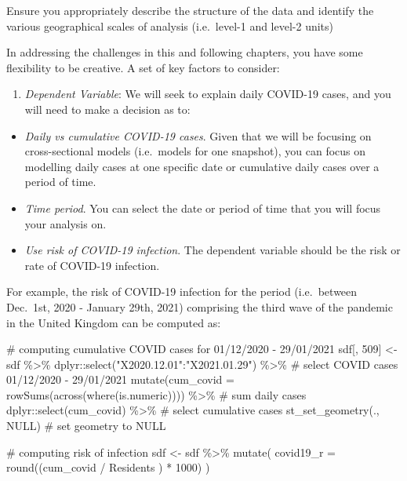 \documentclass[
  letterpaper,
  DIV=11,
  numbers=noendperiod,
  oneside]{scrreprt}
\newenvironment{Shaded}{\begin{snugshade}}{\end{snugshade}}
\newcommand{\AttributeTok}[1]{\textcolor[rgb]{0.40,0.45,0.13}{#1}}
\newcommand{\CommentTok}[1]{\textcolor[rgb]{0.37,0.37,0.37}{#1}}
\newcommand{\ConstantTok}[1]{\textcolor[rgb]{0.56,0.35,0.01}{#1}}
\newcommand{\DecValTok}[1]{\textcolor[rgb]{0.68,0.00,0.00}{#1}}
\newcommand{\FunctionTok}[1]{\textcolor[rgb]{0.28,0.35,0.67}{#1}}
\newcommand{\NormalTok}[1]{\textcolor[rgb]{0.00,0.23,0.31}{#1}}
\newcommand{\OtherTok}[1]{\textcolor[rgb]{0.00,0.23,0.31}{#1}}
\newcommand{\SpecialCharTok}[1]{\textcolor[rgb]{0.37,0.37,0.37}{#1}}
\newcommand{\StringTok}[1]{\textcolor[rgb]{0.13,0.47,0.30}{#1}}
\providecommand{\tightlist}{%
  \setlength{\itemsep}{0pt}\setlength{\parskip}{0pt}}\usepackage{longtable,booktabs,array}
\begin{document}
Ensure you appropriately describe the structure of the data and identify
the various geographical scales of analysis (i.e.~level-1 and level-2
units)

In addressing the challenges in this and following chapters, you have
some flexibility to be creative. A set of key factors to consider:

\begin{enumerate}
\def\labelenumi{\arabic{enumi}.}
\tightlist
\item
  \emph{Dependent Variable}: We will seek to explain daily COVID-19
  cases, and you will need to make a decision as to:
\end{enumerate}

\begin{itemize}
\item
  \emph{Daily vs cumulative COVID-19 cases}. Given that we will be
  focusing on cross-sectional models (i.e.~models for one snapshot), you
  can focus on modelling daily cases at one specific date or cumulative
  daily cases over a period of time.
\item
  \emph{Time period}. You can select the date or period of time that you
  will focus your analysis on.
\item
  \emph{Use risk of COVID-19 infection}. The dependent variable should
  be the risk or rate of COVID-19 infection.
\end{itemize}

For example, the risk of COVID-19 infection for the period (i.e.~between
Dec.~1st, 2020 - January 29th, 2021) comprising the third wave of the
pandemic in the United Kingdom can be computed as:

\begin{Shaded}
\begin{Highlighting}[]
\CommentTok{\# computing cumulative COVID cases for  01/12/2020 {-} 29/01/2021}
\NormalTok{sdf[, }\DecValTok{509}\NormalTok{] }\OtherTok{\textless{}{-}}\NormalTok{ sdf }\SpecialCharTok{\%\textgreater{}\%}\NormalTok{ dplyr}\SpecialCharTok{::}\FunctionTok{select}\NormalTok{(}\StringTok{"X2020.12.01"}\SpecialCharTok{:}\StringTok{"X2021.01.29"}\NormalTok{) }\SpecialCharTok{\%\textgreater{}\%} \CommentTok{\# select COVID cases 01/12/2020 {-} 29/01/2021}
  \FunctionTok{mutate}\NormalTok{(}\AttributeTok{cum\_covid =} \FunctionTok{rowSums}\NormalTok{(}\FunctionTok{across}\NormalTok{(}\FunctionTok{where}\NormalTok{(is.numeric)))) }\SpecialCharTok{\%\textgreater{}\%} \CommentTok{\# sum daily cases}
\NormalTok{  dplyr}\SpecialCharTok{::}\FunctionTok{select}\NormalTok{(cum\_covid) }\SpecialCharTok{\%\textgreater{}\%} \CommentTok{\# select cumulative cases}
   \FunctionTok{st\_set\_geometry}\NormalTok{(., }\ConstantTok{NULL}\NormalTok{) }\CommentTok{\# set geometry to NULL}

\CommentTok{\# computing risk of infection}
\NormalTok{sdf }\OtherTok{\textless{}{-}}\NormalTok{ sdf }\SpecialCharTok{\%\textgreater{}\%}  \FunctionTok{mutate}\NormalTok{(}
  \AttributeTok{covid19\_r =} \FunctionTok{round}\NormalTok{((cum\_covid }\SpecialCharTok{/}\NormalTok{ Residents ) }\SpecialCharTok{*} \DecValTok{1000}\NormalTok{) }
\NormalTok{  )}
\end{Highlighting}
\end{Shaded}
\end{document}
